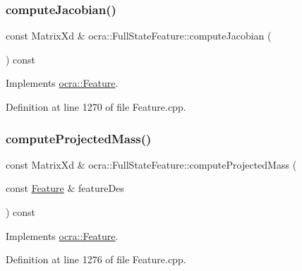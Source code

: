 \subsubsection{\texorpdfstring{compute\+Jacobian()}{computeJacobian()}\hspace{0.1cm}{\footnotesize\ttfamily [2/2]}}
{\footnotesize\ttfamily const Matrix\+Xd \& ocra\+::\+Full\+State\+Feature\+::compute\+Jacobian (\begin{DoxyParamCaption}{ }\end{DoxyParamCaption}) const\hspace{0.3cm}{\ttfamily [virtual]}}



Implements \hyperlink{classocra_1_1Feature_adbab3b388657555abb805bb971c2491f}{ocra\+::\+Feature}.



Definition at line 1270 of file Feature.\+cpp.

\hypertarget{classocra_1_1FullStateFeature_a40f68dad4e231a19b6566fa6829b8f90}{}\label{classocra_1_1FullStateFeature_a40f68dad4e231a19b6566fa6829b8f90} 
\subsubsection{\texorpdfstring{compute\+Projected\+Mass()}{computeProjectedMass()}\hspace{0.1cm}{\footnotesize\ttfamily [1/2]}}
{\footnotesize\ttfamily const Matrix\+Xd \& ocra\+::\+Full\+State\+Feature\+::compute\+Projected\+Mass (\begin{DoxyParamCaption}\item[{const \hyperlink{classocra_1_1Feature}{Feature} \&}]{feature\+Des }\end{DoxyParamCaption}) const\hspace{0.3cm}{\ttfamily [virtual]}}



Implements \hyperlink{classocra_1_1Feature_a44e11dd349e92971fefebff354e7214b}{ocra\+::\+Feature}.



Definition at line 1276 of file Feature.\+cpp.

\hypertarget{classocra_1_1FullStateFeature_a5f2a243a7df81e7843bc258bef9cfae8}{}\label{classocra_1_1FullStateFeature_a5f2a243a7df81e7843bc258bef9cfae8} 
